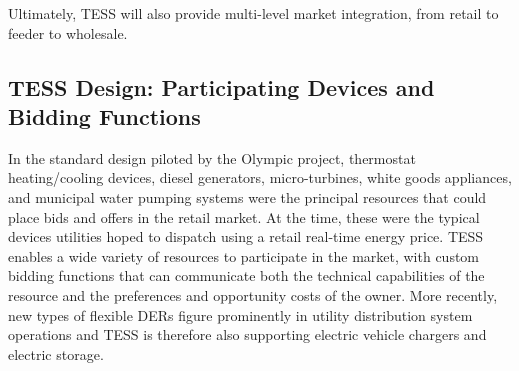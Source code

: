 %

Ultimately, TESS will also provide multi-level market integration, from retail to feeder to wholesale.

\subsection{TESS Design: Participating Devices and Bidding Functions}\label{sec:devices}

In the standard design piloted by the Olympic project, thermostat heating/cooling devices, diesel generators, micro-turbines, white goods appliances, and municipal water pumping systems were the principal resources that could place bids and offers in the retail market.  At the time, these were the typical devices utilities hoped to dispatch using a retail real-time energy price. 
TESS enables a wide variety of resources to participate in the market, with custom bidding functions that can communicate both the technical capabilities of the resource and the preferences and opportunity costs of the owner.
More recently, new types of flexible DERs figure prominently in utility distribution system operations and TESS is therefore also supporting electric vehicle chargers and electric storage.

